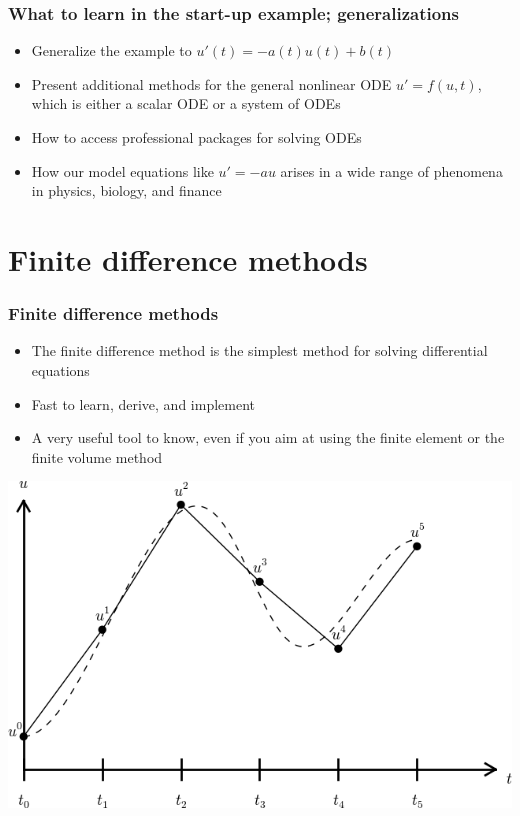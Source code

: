 \documentclass{beamer}
\begin{document}
\begin{frame}
\frametitle{What to learn in the start-up example; generalizations}

\begin{itemize}
 \item Generalize the example to $u'(t)=-a(t)u(t) + b(t)$

 \item Present additional methods for the general nonlinear ODE $u'=f(u,t)$,
   which is either a scalar ODE or a system of ODEs

 \item How to access professional packages for solving ODEs

 \item How our model equations like $u'=-au$ arises in a wide range
   of phenomena in physics, biology, and finance
\end{itemize}

\noindent
\end{frame}

\section{Finite difference methods}

\begin{frame}
\frametitle{Finite difference methods}

\label{decay:fdm}

\begin{itemize}
 \item The finite difference method is the simplest method
   for solving differential equations

 \item Fast to learn, derive, and implement

 \item A very useful tool to know, even if you aim at using the finite element
   or the finite volume method
\end{itemize}

\noindent
\centerline{\includegraphics[width=0.7\linewidth]{fig-alg/fdm_u_uei.png}}




\end{frame}
\end{document}
